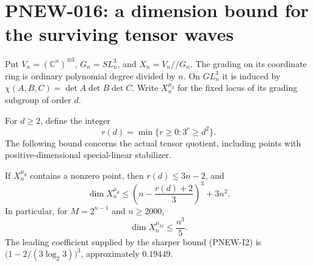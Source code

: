 \section{PNEW-016: a dimension bound for the surviving tensor waves}
\label{sec:tensor-fixed-dimension-gate}

Put $V_n=(\mathbb C^n)^{\otimes3}$, $G_n=SL_n^3$, and
$X_n=V_n//G_n$. The grading on its coordinate ring is ordinary
polynomial degree divided by $n$. On $GL_n^3$ it is induced by
$\chi(A,B,C)=\det A\det B\det C$. Write $X_n^{\mu_d}$ for the
fixed locus of its grading subgroup of order $d$.

For $d\ge2$, define the integer
\[
 r(d)=\min\{r\ge0:3^r\ge d^2\}.
                                                        \tag{PNEW-I1}
\]
The following bound concerns the actual tensor quotient, including
points with positive-dimensional special-linear stabilizer.

\begin{theorem}[PNEW-016a]
If $X_n^{\mu_d}$ contains a nonzero point, then $r(d)\le3n-2$, and
\[
 \dim X_n^{\mu_d}
 \le \left(n-\frac{r(d)+2}{3}\right)^3+3n^2.
                                                        \tag{PNEW-I2}
\]
In particular, for $M=2^{n-1}$ and $n\ge2000$,
\[
 \dim X_n^{\mu_M}\le\frac{n^3}{5}.
                                                        \tag{PNEW-I3}
\]
The leading coefficient supplied by the sharper bound (PNEW-I2) is
$\bigl(1-2/(3\log_2 3)\bigr)^3$, approximately $0.19449$.
\end{theorem}

